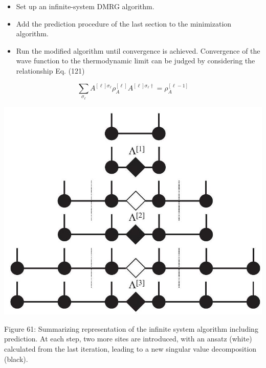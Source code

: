 \documentclass[12pt]{article}
\begin{document}
\begin{itemize}
  \item Set up an infinite-system DMRG algorithm.
  \item Add the prediction procedure of the last section to the minimization algorithm.
  \item Run the modified algorithm until convergence is achieved. Convergence of the wave function to the thermodynamic limit can be judged by considering the relationship Eq. (121)
\end{itemize}


\begin{equation*}
\sum_{\sigma_{\ell}} A^{[\ell] \sigma_{\ell}} \rho_{A}^{[\ell]} A^{[\ell] \sigma_{\ell} \dagger}=\rho_{A}^{[\ell-1]} \tag{341}
\end{equation*}


\begin{center}
\includegraphics[max width=\textwidth]{2024_05_04_afc4ad226da9ccfe0ac8g-109}
\end{center}

Figure 61: Summarizing representation of the infinite system algorithm including prediction. At each step, two more sites are introduced, with an ansatz (white) calculated from the last iteration, leading to a new singular value decomposition (black).
\end{document}
